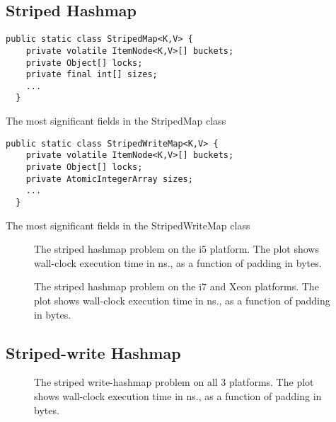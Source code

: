 \subsection{Striped Hashmap}
\begin{code}
\begin{Verbatim}[frame=single]
  public static class StripedMap<K,V> {
    private volatile ItemNode<K,V>[] buckets;
    private Object[] locks;
    private final int[] sizes;
    ...
  }
\end{Verbatim}
	\caption{The most significant fields in the StripedMap class}
\end{code}

\begin{code}
\begin{Verbatim}[frame=single]
  public static class StripedWriteMap<K,V> {
    private volatile ItemNode<K,V>[] buckets;
    private Object[] locks;
    private AtomicIntegerArray sizes;
    ...
  }
\end{Verbatim}
	\caption{The most significant fields in the StripedWriteMap class}
\end{code}

\begin{figure}[hbpt]
\graphicspath{{plots/}}

\caption{The striped hashmap problem on the i5 platform. The plot shows
	wall-clock execution time in ns., as a function of padding in bytes.}
\label{fig:hashmap-striped-i5}
\end{figure}

\begin{figure}[hbpt]
\graphicspath{{plots/}}

\caption{The striped hashmap problem on the i7 and Xeon platforms. The plot shows
	wall-clock execution time in ns., as a function of padding in bytes.}
\label{fig:hashmap-striped-i7}
\end{figure}

\subsection{Striped-write Hashmap}

\begin{figure}[hbpt]
\graphicspath{{plots/}}

\caption{The striped write-hashmap problem on all 3 platforms. The plot shows
	wall-clock execution time in ns., as a function of padding in bytes.}
\label{fig:hashmap-striped-xeon}
\end{figure}
